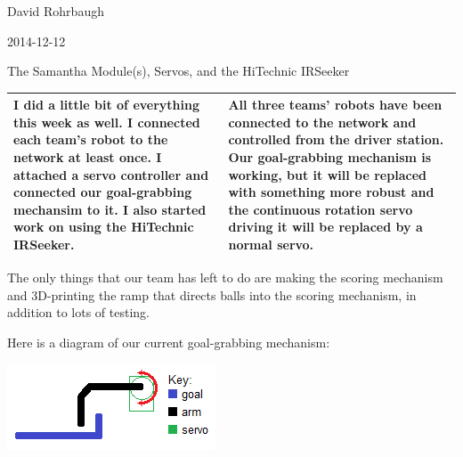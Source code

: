 David Rohrbaugh

2014-12-12

The Samantha Module(s), Servos, and the HiTechnic IRSeeker

\begin{tabular}{|p{5cm}|p{5cm}|}
 \hline
 I did a little bit of everything this week as well. I connected each team's robot to the network at least once. I attached a servo controller and connected our goal-grabbing mechansim to it. I also started work on using the HiTechnic IRSeeker.
 &
 All three teams' robots have been connected to the network and controlled from the driver station. Our goal-grabbing mechanism is working, but it will be replaced with something more robust and the continuous rotation servo driving it will be replaced by a normal servo.
 \\
 \hline
\end{tabular}

\medskip

The only things that our team has left to do are making the scoring mechanism and 3D-printing the ramp that directs balls into the scoring mechanism, in addition to lots of testing.

\medskip

Here is a diagram of our current goal-grabbing mechanism:

\begin{center}
 \includegraphics{./Entries/Images/goalGrabber.png}
\end{center}